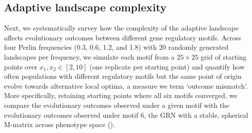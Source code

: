 \subsection{Adaptive landscape complexity}

Next, we systematically survey how the complexity of the adaptive landscape affects evolutionary outcomes between different gene regulatory motifs.
Across four Perlin frequencies (0.3, 0.6, 1.2, and 1.8) with 20 randomly generated landscapes per frequency, we simulate each motif from a $25 \times 25$ grid of starting points over $x_1, x_2 \in [2, 10]$ (one replicate per starting point) and quantify how often populations with different regulatory motifs but the same point of origin evolve towards alternative local optima, a measure we term `outcome mismatch'.
More specifically, retaining starting points where all six motifs converged, we compare the evolutionary outcomes observed under a given motif with the evolutionary outcomes observed under motif 6, the GRN with a stable, spherical M-matrix across phenotype space ().

